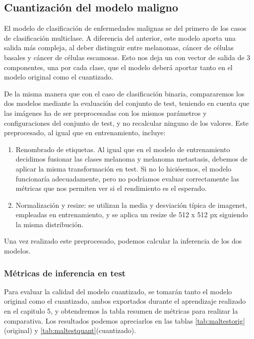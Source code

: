 \subsection{Cuantización del modelo maligno}

El modelo de clasificación de enfermedades malignas se del primero de los casos de clasificación multiclase. A diferencia del anterior, este modelo aporta una salida más compleja, al deber distinguir entre melanomas, cáncer de células basales y cáncer de células escamosas. Esto nos deja un con vector de salida de 3 componentes, una por cada clase, que el modelo deberá aportar tanto en el modelo original como el cuantizado.

De la misma manera que con el caso de clasificación binaria, compararemos los dos modelos mediante la evaluación del conjunto de test, teniendo en cuenta que las imágenes ha de ser preprocesadas con los mismos parámetros y configuraciones del conjunto de test, y no recalcular ninguno de los valores. Este preprocesado, al igual que en entrenamiento, incluye:

\begin{enumerate}
	\item Renombrado de etiquetas. Al igual que en el modelo de entrenamiento decidimos fusionar las clases melanoma y melanoma metastasis, debemos de aplicar la misma transformación en test. Si no lo hiciésemos, el modelo funcionaría adecuadamente, pero no podríamos evaluar correctamente las métricas que nos permiten ver si el rendimiento es el esperado.
	 \item Normalización y resize: se utilizan la media y desviación típica de imagenet, empleadas en entrenamiento, y se aplica un resize de 512 x 512 px siguiendo la misma distribución.
\end{enumerate}

Una vez realizado este preprocesado, podemos calcular la inferencia de los dos modelos.

\subsubsection{Métricas de inferencia en test}
Para evaluar la calidad del modelo cuantizado, se tomarán tanto el modelo original como el cuantizado, ambos exportados durante el aprendizaje realizado en el capitulo 5, y obtendremos la tabla resumen de métricas para realizar la comparativa.
Los resultados  podemos apreciarlos en las tablas \ref{tab:maltestorig} (original) y \ref{tab:maltestquant}(cuantizado).


